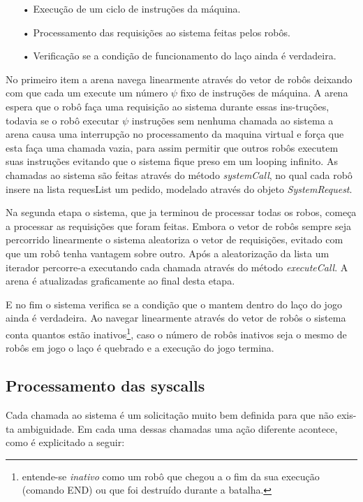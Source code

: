 \documentclass[a4paper]{article}
\begin{document}
\begin{itemize}
\item[•]{Execução de um ciclo de instruções da máquina.}
\item[•]{Processamento das requisições ao sistema feitas pelos robôs.}
\item[•]{Verificação se a condição de funcionamento do laço ainda é verdadeira.}
\end{itemize}

No primeiro item a arena navega linearmente através do vetor de robôs deixando com que cada um execute um número $\psi$ fixo de instruções de máquina. A arena espera que o robô faça uma requisição ao sistema durante essas ins-truções, todavia se o robô executar $\psi$ instruções sem nenhuma chamada ao sistema a arena causa uma interrupção no processamento da maquina virtual e força que esta faça uma chamada vazia, para assim permitir que outros robôs executem suas instruções evitando que o sistema fique preso em um looping infinito. As chamadas ao sistema são feitas através do método \textit{systemCall}, no qual cada robô insere na lista requesList um pedido, modelado através do objeto \textit{SystemRequest}. 

Na segunda etapa o sistema, que ja terminou de processar todas os robos, começa a processar as requisições que foram feitas. Embora o vetor de robôs sempre seja percorrido linearmente o sistema aleatoriza o vetor de requisições, evitado com que um robô tenha vantagem sobre outro. Após a aleatorização da lista um iterador percorre-a executando cada chamada através do método \textit{executeCall}. A arena é atualizadas graficamente ao final desta etapa.

E no fim o sistema verifica se a condição que o mantem dentro do laço do jogo ainda é verdadeira. Ao navegar linearmente através do vetor de robôs o sistema conta quantos estão inativos\footnote{entende-se \textit{inativo} como um robô que chegou a o fim da sua execução (comando END) ou que foi destruído durante a batalha.}, caso o número de robôs inativos seja o mesmo de robôs em jogo o laço é quebrado e a execução do jogo termina. 

\subsection{Processamento das syscalls}
Cada chamada ao sistema é um solicitação muito bem definida para que não exis-ta ambiguidade. Em cada uma dessas chamadas uma ação diferente acontece, como é explicitado a seguir:
\end{document}
